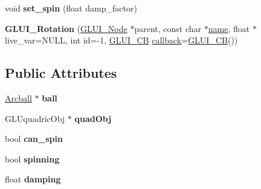 \begin{DoxyCompactItemize}
\item 
\hypertarget{class_g_l_u_i___rotation_aac8678582493d922dc29a76f9c38adbc}{void {\bfseries set\+\_\+spin} (float damp\+\_\+factor)}\label{class_g_l_u_i___rotation_aac8678582493d922dc29a76f9c38adbc}

\item 
\hypertarget{class_g_l_u_i___rotation_a09fc7b3a09cbe61a5ef58d970f86adfe}{{\bfseries G\+L\+U\+I\+\_\+\+Rotation} (\hyperlink{class_g_l_u_i___node}{G\+L\+U\+I\+\_\+\+Node} $\ast$parent, const char $\ast$\hyperlink{class_g_l_u_i___control_aa95b97d50df45335fc33f0af03958eb3}{name}, float $\ast$live\+\_\+var=N\+U\+L\+L, int id=-\/1, \hyperlink{class_g_l_u_i___c_b}{G\+L\+U\+I\+\_\+\+C\+B} \hyperlink{class_g_l_u_i___control_a96060fe0cc6d537e736dd6eef78e24ab}{callback}=\hyperlink{class_g_l_u_i___c_b}{G\+L\+U\+I\+\_\+\+C\+B}())}\label{class_g_l_u_i___rotation_a09fc7b3a09cbe61a5ef58d970f86adfe}

\end{DoxyCompactItemize}
\subsection*{Public Attributes}
\begin{DoxyCompactItemize}
\item 
\hypertarget{class_g_l_u_i___rotation_ae57cc59ce48aec071b5db4fe608b98b3}{\hyperlink{class_arcball}{Arcball} $\ast$ {\bfseries ball}}\label{class_g_l_u_i___rotation_ae57cc59ce48aec071b5db4fe608b98b3}

\item 
\hypertarget{class_g_l_u_i___rotation_af98f7b7cec5463b46b3ba1f685ef142c}{G\+L\+Uquadric\+Obj $\ast$ {\bfseries quad\+Obj}}\label{class_g_l_u_i___rotation_af98f7b7cec5463b46b3ba1f685ef142c}

\item 
\hypertarget{class_g_l_u_i___rotation_abb7e1e037705d27ac91805ac21ddbd39}{bool {\bfseries can\+\_\+spin}}\label{class_g_l_u_i___rotation_abb7e1e037705d27ac91805ac21ddbd39}

\item 
\hypertarget{class_g_l_u_i___rotation_a49f0172a0fe24adb308730664f083018}{bool {\bfseries spinning}}\label{class_g_l_u_i___rotation_a49f0172a0fe24adb308730664f083018}

\item 
\hypertarget{class_g_l_u_i___rotation_a3164bbd01acc6e91b845c72df6987a51}{float {\bfseries damping}}\label{class_g_l_u_i___rotation_a3164bbd01acc6e91b845c72df6987a51}

\end{DoxyCompactItemize}
